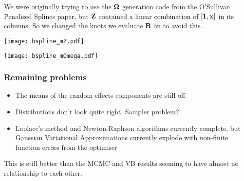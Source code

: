 \documentclass{beamer}
\begin{document}
\begin{frame}
We were originally  trying to use the ${\boldsymbol \Omega}$ generation code from the O'Sullivan Penalised 
Splines paper, but ${\bf Z}$ contained a linear combination of $[{\bf 1}, {\bf x}]$ in its columns. So 
we changed the knots we evaluate ${\bf B}$ on to avoid this.
\end{frame}

\begin{frame}
	\texttt{[image: bspline\_mZ.pdf]}
\end{frame}

\begin{frame}
	\texttt{[image: bspline\_mOmega.pdf]}
\end{frame}

\begin{frame}
\frametitle{Remaining problems}
\begin{itemize}
\item The means of the random effects components are still off
\item Distributions don't look quite right. Sampler problem?
\item Laplace's method and Newton-Raphson algorithms currently complete, but
			Gaussian Variational Approximations currently explode with non-finite function
			errors from the optimiser
\end{itemize}

This is still better than the MCMC and VB results seeming to have almost no relationship
to each other.

\end{frame}
\end{document}
